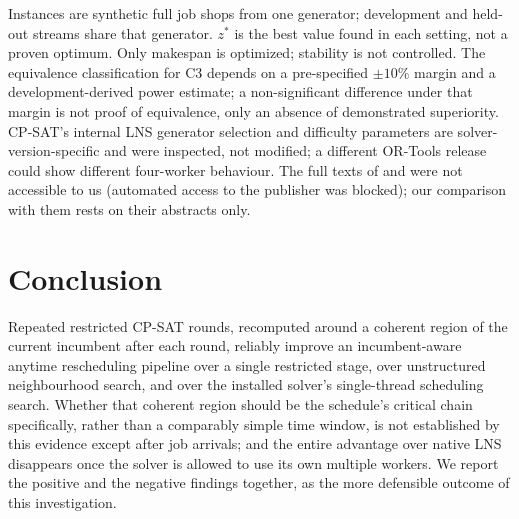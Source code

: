 \documentclass[letterpaper]{article} %
\begin{document}
Instances are synthetic full job shops from one generator; development and held-out streams share that generator. $z^*$ is the best value found in each setting, not a proven optimum. Only makespan is optimized; stability is not controlled. The equivalence classification for C3 depends on a pre-specified $\pm10\%$ margin and a development-derived power estimate; a non-significant difference under that margin is not proof of equivalence, only an absence of demonstrated superiority. CP-SAT's internal LNS generator selection and difficulty parameters are solver-version-specific and were inspected, not modified; a different OR-Tools release could show different four-worker behaviour. The full texts of \citet{sun2026} and \citet{linyang2026} were not accessible to us (automated access to the publisher was blocked); our comparison with them rests on their abstracts only.

\section{Conclusion}

Repeated restricted CP-SAT rounds, recomputed around a coherent region of the current incumbent after each round, reliably improve an incumbent-aware anytime rescheduling pipeline over a single restricted stage, over unstructured neighbourhood search, and over the installed solver's single-thread scheduling search. Whether that coherent region should be the schedule's critical chain specifically, rather than a comparably simple time window, is not established by this evidence except after job arrivals; and the entire advantage over native LNS disappears once the solver is allowed to use its own multiple workers. We report the positive and the negative findings together, as the more defensible outcome of this investigation.


\end{document}
